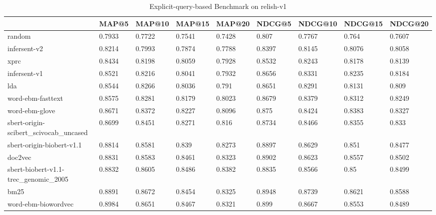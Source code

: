 \begin{table}
\centering
\caption{Explicit-query-based Benchmark on relish-v1}
\label{tab:query-benchmark-relish-v1}
\begin{tabular}{lllllllll}
\toprule
{} &    MAP@5 &  MAP@10 &  MAP@15 &  MAP@20 &   NDCG@5 & NDCG@10 & NDCG@15 & NDCG@20 \\
\midrule
random                                           &   0.7933 &  0.7722 &  0.7541 &  0.7428 &    0.807 &  0.7767 &   0.764 &  0.7607 \\
infersent-v2                                     &   0.8214 &  0.7993 &  0.7874 &  0.7788 &   0.8397 &  0.8145 &  0.8076 &  0.8058 \\
xprc                                             &   0.8434 &  0.8198 &  0.8059 &  0.7928 &   0.8532 &  0.8243 &  0.8178 &  0.8139 \\
infersent-v1                                     &   0.8521 &  0.8216 &  0.8041 &  0.7932 &   0.8656 &  0.8331 &  0.8235 &  0.8184 \\
lda                                              &   0.8544 &  0.8266 &  0.8036 &   0.791 &   0.8651 &  0.8291 &  0.8131 &   0.809 \\
word-ebm-fasttext                                &   0.8575 &  0.8281 &  0.8179 &  0.8023 &   0.8679 &  0.8379 &  0.8312 &  0.8249 \\
word-ebm-glove                                   &   0.8671 &  0.8372 &  0.8227 &  0.8096 &    0.875 &  0.8424 &  0.8383 &  0.8327 \\
sbert-origin-scibert\_scivocab\_uncased            &   0.8699 &  0.8451 &  0.8271 &   0.816 &   0.8734 &  0.8466 &  0.8355 &   0.833 \\
sbert-origin-biobert-v1.1                        &   0.8814 &  0.8581 &   0.839 &  0.8273 &   0.8897 &  0.8629 &   0.851 &  0.8477 \\
doc2vec                                          &   0.8831 &  0.8583 &  0.8461 &  0.8323 &   0.8902 &  0.8623 &  0.8557 &  0.8502 \\
sbert-biobert-v1.1-trec\_genomic\_2005             &   0.8832 &  0.8605 &  0.8486 &  0.8382 &   0.8835 &  0.8566 &    0.85 &  0.8499 \\
bm25                                             &   0.8891 &  0.8672 &  0.8454 &  0.8325 &   0.8948 &  0.8739 &  0.8621 &  0.8588 \\
word-ebm-biowordvec                              &   0.8984 &  0.8651 &  0.8467 &  0.8321 &    0.899 &  0.8667 &  0.8553 &  0.8489 \\

\end{tabular}
\end{table}

